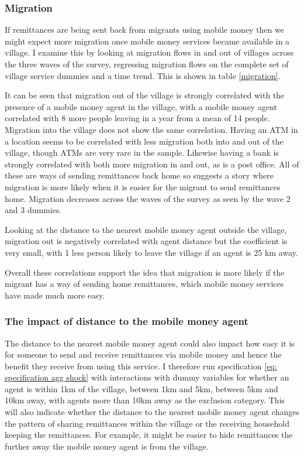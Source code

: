 \subsubsection{Migration}
If remittances are being sent back from migrants using mobile money then we might expect more migration once mobile money services became available in a village. I examine this by looking at migration flows in and out of villages across the three waves of the survey, regressing migration flows on the complete set of village service dummies and a time trend. This is shown in table \ref{migration}. 

It can be seen that migration out of the village is strongly correlated with the presence of a mobile money agent in the village, with a mobile money agent correlated with 8 more people leaving in a year from a mean of 14 people. Migration into the village does not show the same correlation. Having an ATM in a location seems to be correlated with less migration both into and out of the village, though ATMs are very rare in the sample. Likewise having a bank is strongly correlated with both more migration in and out, as is a post office. All of these are ways of sending remittances back home so suggests a story where migration is more likely when it is easier for the migrant to send remittances home. Migration decreases across the waves of the survey as seen by the wave 2 and 3 dummies. 

Looking at the distance to the nearest mobile money agent outside the village, migration out is negatively correlated with agent distance but the coefficient is very small, with 1 less person likely to leave the village if an agent is 25 km away.

Overall these correlations support the idea that migration is more likely if the migrant has a way of sending home remittances, which mobile money services have made much more easy. 


\subsubsection{The impact of distance to the mobile money agent}
The distance to the nearest mobile money agent could also impact how easy it is for someone to send and receive remittances via mobile money and hence the benefit they receive from using this service. I therefore run specification \eqref{eq: specification agg shock} with interactions with dummy variables for whether an agent is within 1km of the village, between 1km and 5km, between 5km and 10km away, with agents more than 10km away as the exclusion category. This will also indicate whether the distance to the nearest mobile money agent changes the pattern of sharing remittances within the village or the receiving household keeping the remittances. For example, it might be easier to hide remittances the further away the mobile money agent is from the village. 

